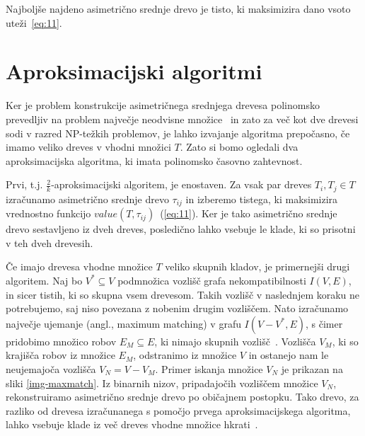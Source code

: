 \documentclass[a4paper, 12pt]{book}
\begin{document}
\noindent Najboljše najdeno asimetrično srednje drevo je tisto, ki maksimizira dano vsoto 
uteži~\ref{eq:11}.

\section{Aproksimacijski algoritmi}
Ker je problem konstrukcije asimetričnega srednjega drevesa polinomsko prevedljiv 
na problem največje neodvisne množice~\cite{pw} in zato za več kot dve drevesi 
sodi v razred NP-težkih problemov, je lahko izvajanje algoritma prepočasno, če 
imamo veliko dreves v vhodni množici $T$. Zato si bomo ogledali dva 
aproksimacijska algoritma, ki imata polinomsko časovno zahtevnost.

Prvi, t.j. $\frac{2}{k}$-aproksimacijski algoritem, je enostaven. Za vsak par dreves 
$T_i, T_j \in T$ izračunamo asimetrično srednje drevo $\tau_{ij}$ in izberemo 
tistega, ki maksimizira vrednostno funkcijo $value(T, \tau_{ij})$~(\ref{eq:11}). Ker je tako 
asimetrično srednje drevo sestavljeno iz dveh dreves, posledično lahko vsebuje 
le klade, ki so prisotni v teh dveh drevesih.

Če imajo drevesa vhodne množice $T$ veliko skupnih kladov, je primernejši 
drugi algoritem. Naj bo $V^* \subseteq V$ podmnožica vozlišč grafa nekompatibilnosti 
$I(V, E)$, in sicer tistih, ki so skupna vsem drevesom. Takih vozlišč v naslednjem 
koraku ne potrebujemo, saj niso povezana z nobenim drugim vozliščem. Nato izračunamo 
največje ujemanje (angl., maximum matching) v grafu $I(V - V^*, E)$, s čimer pridobimo 
množico robov $E_{M} \subseteq E$, ki nimajo skupnih vozlišč~\cite{mgt}. 
Vozlišča $V_{M}$, ki so krajišča robov iz množice $E_{M}$, odstranimo iz množice $V$ 
in ostanejo nam le neujemajoča vozlišča $V_{N} = V - V_{M}$. Primer iskanja množice 
$V_N$ je prikazan na sliki \ref{img-maxmatch}. Iz binarnih nizov, pripadajočih 
vozliščem množice $V_{N}$, rekonstruiramo asimetrično srednje drevo po običajnem 
postopku. Tako drevo, za razliko od drevesa izračunanega s pomočjo prvega 
aproksimacijskega algoritma, lahko vsebuje klade iz več dreves vhodne 
množice hkrati~\cite{pw}. 
\end{document}
